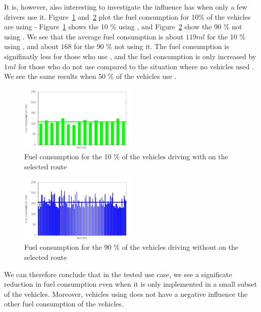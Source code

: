 It is, however, also interesting to investigate the influence \tech has when only a few drivers use it.
Figure~\ref{fig:TestResults:fuelControlled10} and~\ref{fig:TestResults:fuelUncontrolled10} plot the fuel consumption for 10\% of the vehicles are using \tech - Figure~\ref{fig:TestResults:fuelControlled10} shows the 10 \% using \tech, and Figure~\ref{fig:TestResults:fuelUncontrolled10} show the 90 \% not using \tech.
We see that the average fuel consumption is about $119 ml$ for the 10 \% using \tech, and about $168$ for the 90 \% not using it.
The fuel consumption is signifinatly less for those who use \tech, and the fuel consumption is only increased by $1 ml$ for those who do not use \tech compared to the situation where no vehicles used \tech.
We see the same results when 50 \% of the vehicles use \tech.
\begin{figure}[h]
\includegraphics[width=0.5\textwidth]{../images/tp0/fuelRouteControlled10.png}
\caption{Fuel consumption for the 10 \% of the vehicles driving with \tech on the selected route}
\label{fig:TestResults:fuelControlled10}
\end{figure}
\begin{figure}[h]
\includegraphics[width=0.5\textwidth]{../images/tp0/fuelRouteUncontrolled10.png}
\caption{Fuel consumption for the 90 \% of the vehicles driving without \tech on the selected route}
\label{fig:TestResults:fuelUncontrolled10}
\end{figure}

We can therefore conclude that in the tested use case, we see a significate reduction in fuel consumption even when it is only implemented in a small subset of the vehicles. 
Moreover, vehicles using \tech does not have a negative influence the other fuel consumption of the vehicles.

